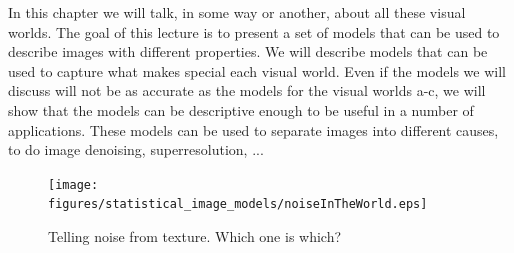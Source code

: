 %
%
%
%
In this chapter we will talk, in some way or another, about all these visual worlds. The goal of this lecture is to present a set of models that can be used to describe images with different properties. We will describe models that can be used to capture what makes special each visual world. Even if the models we will discuss will not be as accurate as the models for the visual worlds a-c, we will show that the models can be descriptive enough to be useful in a number of applications.  These models can be used to separate images into different causes, to do image denoising, superresolution, ...




\begin{figure}[htpb]
  \centerline{
    \texttt{[image: figures/statistical\_image\_models/noiseInTheWorld.eps]}
  }
  \caption{Telling noise from texture. Which one is which?}
  \label{fig:noiseInTheWorld}
\end{figure}





% 


